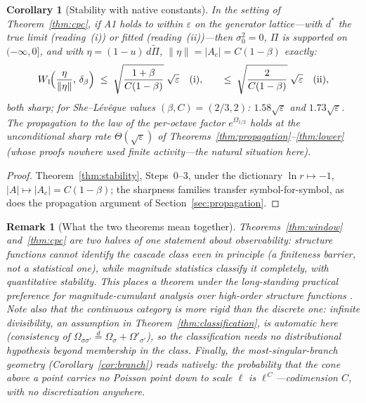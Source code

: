 \documentclass[pdflatex,sn-mathphys-num]{sn-jnl}
\theoremstyle{thmstyleone}
\newtheorem{corollary}[theorem]{Corollary}
\theoremstyle{thmstyletwo}
\newtheorem*{remark}{Remark}
\theoremstyle{thmstylethree}
\begin{document}
\begin{corollary}[Stability with native constants]\label{cor:mrmstab}
In the setting of Theorem~\textup{\ref{thm:cpc}}, if A1 holds to
within $\varepsilon$ on the generator lattice---with $d^*$ the true
limit (reading~(i)) or fitted (reading~(ii))---then $\sigma_0^2 =
0$, $\Pi$ is supported on $(-\infty,0]$, and with $\eta =
(1-u)\,d\tilde\Pi$, $\|\eta\| = |A_c| = C(1-\beta)$ exactly:
\[
  W_1\!\Bigl(\frac{\eta}{\|\eta\|},\,\delta_\beta\Bigr)
  \;\le\; \sqrt{\frac{1+\beta}{C(1-\beta)}}\;\sqrt{\varepsilon}
  \quad\textup{(i)},
  \qquad
  \le\; \sqrt{\frac{2}{C(1-\beta)}}\;\sqrt{\varepsilon}
  \quad\textup{(ii)},
\]
both sharp; for She--L\'ev\^eque values $(\beta, C) = (2/3, 2)$:
$1.58\sqrt\varepsilon$ and $1.73\sqrt\varepsilon$.  The propagation
to the law of the per-octave factor $e^{\Omega_{1/2}}$ holds at the
unconditional sharp rate $\Theta(\sqrt\varepsilon)$ of
Theorems~\ref{thm:propagation}--\ref{thm:lower} (whose proofs nowhere
used finite activity---the natural situation here).
\end{corollary}

\begin{proof}
Theorem~\ref{thm:stability}, Steps~0--3, under the dictionary
$\ln r \mapsto -1$, $|A| \mapsto |A_c| = C(1-\beta)$; the sharpness
families transfer symbol-for-symbol, as does the propagation
argument of Section~\ref{sec:propagation}.
\end{proof}

\begin{remark}[What the two theorems mean together]
Theorems~\ref{thm:window} and~\ref{thm:cpc} are two halves of one
statement about observability: structure functions cannot identify
the cascade class even in principle (a finiteness barrier, not a
statistical one), while magnitude statistics classify it completely,
with quantitative stability.  This places a theorem under the
long-standing practical preference for magnitude-cumulant analysis
over high-order structure functions \cite{DMA01}.  Note also that
the continuous category is \emph{more} rigid than the discrete one:
infinite divisibility, an assumption in
Theorem~\ref{thm:classification}, is automatic here (consistency of
$\Omega_{\sigma\sigma'} \stackrel{d}{=} \Omega_\sigma +
\Omega'_{\sigma'}$), so the classification needs no distributional
hypothesis beyond membership in the class.  Finally, the
most-singular-branch geometry (Corollary~\ref{cor:branch}) reads
natively: the probability that the cone above a point carries no
Poisson point down to scale $\ell$ is $\ell^{\,C}$---codimension
$C$, with no discretization anywhere.
\end{remark}
\end{document}
